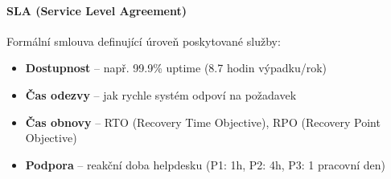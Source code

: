 \paragraph{SLA (Service Level Agreement)}
Formální smlouva definující úroveň poskytované služby:
\begin{itemize}
  \item \textbf{Dostupnost} -- např. 99.9\% uptime (8.7 hodin výpadku/rok)
  \item \textbf{Čas odezvy} -- jak rychle systém odpoví na požadavek
  \item \textbf{Čas obnovy} -- RTO (Recovery Time Objective), RPO (Recovery Point Objective)
  \item \textbf{Podpora} -- reakční doba helpdesku (P1: 1h, P2: 4h, P3: 1 pracovní den)
\end{itemize}

